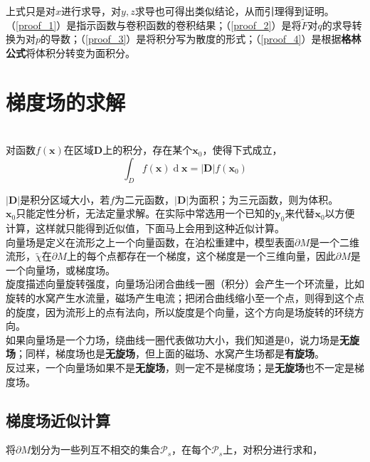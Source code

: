 上式只是对$x$进行求导，对$y,z$求导也可得出类似结论，从而引理得到证明。\qedsymbol
\\

（\ref{proof_1}）是指示函数与卷积函数的卷积结果；（\ref{proof_2}）是将$\tilde{F}$对$q$的求导转换为对$p$的导数；（\ref{proof_3}）是将积分写为散度的形式；（\ref{proof_4}）是根据\textbf{格林公式}将体积分转变为面积分。

\section{梯度场的求解}

\\

	对函数$f(\mathbf{x})$在区域$\mathbf{D}$上的积分，存在某个$\mathbf{x}_0$，使得下式成立，
	$$
		\int_D f(\mathbf{x}) \mathop{d}\mathbf{x} = |\mathbf{D}|f(\mathbf{x}_0)
	$$

	$|\mathbf{D}|$是积分区域大小，若$f$为二元函数，$|\mathbf{D}|$为面积；为三元函数，则为体积。\\

	$\mathbf{x}_0$只能定性分析，无法定量求解。在实际中常选用一个已知的$\mathbf{y}_0$来代替$\mathbf{x}_0$以方便计算，这样就只能得到近似值，下面马上会用到这种近似计算。\\

 \quad 向量场是定义在流形之上一个向量函数，在泊松重建中，模型表面$\partial M$是一个二维流形，$\tilde{\chi}$在$\partial M$上的每个点都存在一个梯度，这个梯度是一个三维向量，因此$\partial M$是一个向量场，或梯度场。\\

 \quad 旋度描述向量旋转强度，向量场沿闭合曲线一圈（积分）会产生一个环流量，比如旋转的水窝产生水流量，磁场产生电流；把闭合曲线缩小至一个点，则得到这个点的旋度，因为流形上的点有法向，所以旋度是个向量，这个方向是场旋转的环绕方向。\\

如果向量场是一个力场，绕曲线一圈代表做功大小，我们知道是0，说力场是\textbf{无旋场}；同样，梯度场也是\textbf{无旋场}，但上面的磁场、水窝产生场都是\textbf{有旋场}。\\

反过来，一个向量场如果不是\textbf{无旋场}，则一定不是梯度场；是\textbf{无旋场}也不一定是梯度场。

\subsection*{梯度场近似计算}
将$\partial M$划分为一些列互不相交的集合$\mathcal{P}_s$，在每个$\mathcal{P}_s$上，对积分进行求和，

